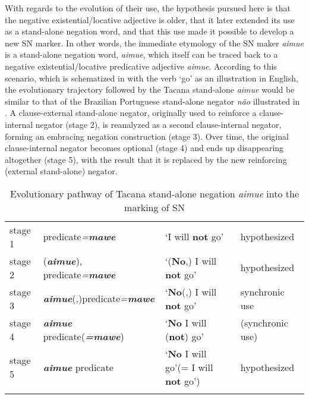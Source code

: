 \documentclass[output=paper]{langsci/langscibook}
\begin{document}
With regards to the evolution of their use, the hypothesis pursued
here is that the negative existential\slash locative adjective is older,
that it later extended its use as a stand-alone negation word, and that
this use made it possible to develop a new SN marker. In other words, the
immediate etymology of the SN maker \textit{aimue} is a stand-alone
negation word, \textit{aimue}, which itself can be traced back to a
negative existential\slash locative predicative adjective \textit{aimue}.
According to this scenario, which is schematized in
 with the verb `go' as an illustration in
English, the evolutionary trajectory followed by the Tacana stand-alone
\textit{aimue} would be similar to that of the Brazilian
Portuguese
stand-alone negator \textit{não} illustrated in .
A clause-external stand-alone negator, originally used to reinforce a
clause-internal negator (stage 2), is reanalyzed as a second
clause-internal negator, forming an embracing negation construction (stage
3). Over time, the original clause-internal negator becomes optional (stage
4) and ends up disappearing altogether (stage 5), with the result that it
is replaced by the new reinforcing (external stand-alone)
negator. 
%
\begin{table}\begin{small}\caption{Evolutionary pathway of Tacana stand-alone negation
\emph{aimue} into the marking of SN}\label{tab:tacana-aimue-pathway}
\begin{tabularx}{\textwidth}{l l Q l}
\lsptoprule
stage 1 & predicate\textit{=\textbf{mawe}} & `I will \textbf{not} go' & hypothesized\\
stage 2 & (\textbf{\textit{aimue}}), predicate\textit{=\textbf{mawe}} & `(\textbf{No},) I will \textbf{not} go' & hypothesized\\
stage 3 & \textbf{\textit{aimue}}(,)predicate\textit{=\textbf{mawe}} & `\textbf{No}(,) I will \textbf{not} go' & synchronic use\\
stage 4 & \textbf{\textit{aimue}} predicate(\textbf{\textit{=mawe}}) & `\textbf{No} I will (\textbf{not}) go' & (synchronic use)\\
stage 5 & \textbf{\textit{aimue}} predicate & `\textbf{No} I will
go'\newline (= I will \textbf{not} go') & hypothesized\\
\lspbottomrule
\end{tabularx}\end{small}\end{table}
\end{document}
